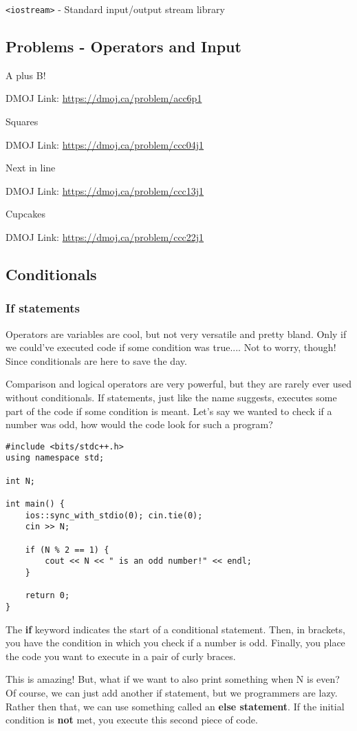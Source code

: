 \documentclass{report}
\newcommand{\problem}[2]{
    \begin{problembox}
        #1
        
        DMOJ Link: \href{#2}{#2}
    \end{problembox}
}
\begin{document}
\begin{note}
    \texttt{<iostream>} - Standard input/output stream library
\end{note}

\subsection{Problems - Operators and Input}
\problem{A plus B!}{https://dmoj.ca/problem/acc6p1}
\problem{Squares}{https://dmoj.ca/problem/ccc04j1}
\problem{Next in line}{https://dmoj.ca/problem/ccc13j1}
\problem{Cupcakes}{https://dmoj.ca/problem/ccc22j1}

\subsection{Conditionals}

\subsubsection{If statements}
Operators are variables are cool, but not very versatile and pretty bland. Only if we could've executed code if some condition was true.... Not to worry, though! Since conditionals are here to save the day.

Comparison and logical operators are very powerful, but they are rarely ever used without conditionals. If statements, just like the name suggests, executes some part of the code if some condition is meant. Let's say we wanted to check if a number was odd, how would the code look for such a program?

\begin{lstlisting}[caption=Odd]
#include <bits/stdc++.h>
using namespace std;

int N;

int main() {
    ios::sync_with_stdio(0); cin.tie(0);
    cin >> N;

    if (N % 2 == 1) {
        cout << N << " is an odd number!" << endl;
    }

    return 0;
}
\end{lstlisting}

The \textbf{if} keyword indicates the start of a conditional statement. Then, in brackets, you have the condition in which you check if a number is odd. Finally, you place the code you want to execute in a pair of curly braces.

This is amazing! But, what if we want to also print something when N is even? Of course, we can just add another if statement, but we programmers are lazy. Rather then that, we can use something called an \textbf{else statement}. If the initial condition is \textbf{not} met, you execute this second piece of code.
\end{document}
